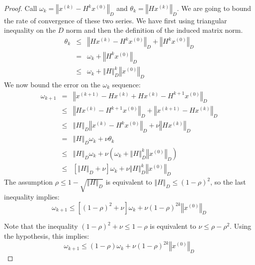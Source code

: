\begin{proof} Call $\omega_{k}=\left\Vert x^{\left(k\right)}-H^{k}x^{\left(0\right)}\right\Vert _{D}$
and $\theta_{k}=\left\Vert Hx^{\left(k\right)}\right\Vert _{D}$.
We are going to bound the rate of convergence of these two series.
We have first using triangular inequality on the $D$ norm and then
the definition of the induced matrix norm. 
\begin{eqnarray*}
\theta_{k} & \leq & \left\Vert Hx^{\left(k\right)}-H^{k}x^{\left(0\right)}\right\Vert _{D}+\left\Vert H^{k}x^{\left(0\right)}\right\Vert _{D}\\
 & = & \omega_{k}+\left\Vert H^{k}x^{\left(0\right)}\right\Vert _{D}\\
 & \leq & \omega_{k}+\left\Vert H\right\Vert _{D}^{k}\left\Vert x^{\left(0\right)}\right\Vert _{D}
\end{eqnarray*}
We now bound the error on the $\omega_{k}$ sequence: 
\begin{eqnarray*}
\omega_{k+1} & = & \left\Vert x^{\left(k+1\right)}-Hx^{\left(k\right)}+Hx^{\left(k\right)}-H^{k+1}x^{\left(0\right)}\right\Vert _{D}\\
 & \leq & \left\Vert Hx^{\left(k\right)}-H^{k+1}x^{\left(0\right)}\right\Vert _{D}+\left\Vert x^{\left(k+1\right)}-Hx^{\left(k\right)}\right\Vert _{D}\\
 & \leq & \left\Vert H\right\Vert _{D}\left\Vert x^{\left(k\right)}-H^{k}x^{\left(0\right)}\right\Vert _{D}+\nu\left\Vert Hx^{\left(k\right)}\right\Vert _{D}\\
 & = & \left\Vert H\right\Vert _{D}\omega_{k}+\nu\theta_{k}\\
 & \leq & \left\Vert H\right\Vert _{D}\omega_{k}+\nu\left(\omega_{k}+\left\Vert H\right\Vert _{D}^{k}\left\Vert x^{\left(0\right)}\right\Vert _{D}\right)\\
 & \leq & \left[\left\Vert H\right\Vert _{D}+\nu\right]\omega_{k}+\nu\left\Vert H\right\Vert _{D}^{k}\left\Vert x^{\left(0\right)}\right\Vert _{D}
\end{eqnarray*}
The assumption $\rho\leq1-\sqrt{\left\Vert H\right\Vert _{D}}$ is
equivalent to $\left\Vert H\right\Vert _{D}\leq\left(1-\rho\right)^{2}$,
so the last inequality implies:
\[
\omega_{k+1}\leq\left[\left(1-\rho\right)^{2}+\nu\right]\omega_{k}+\nu\left(1-\rho\right)^{2k}\left\Vert x^{\left(0\right)}\right\Vert _{D}
\]


Note that the inequality $\left(1-\rho\right)^{2}+\nu\leq1-\rho$
is equivalent to $\nu\leq\rho-\rho^{2}$. Using the hypothesis, this
implies: 
\begin{equation}
\omega_{k+1}\leq\left(1-\rho\right)\omega_{k}+\nu\left(1-\rho\right)^{2k}\left\Vert x^{\left(0\right)}\right\Vert _{D}\label{eq:anon1}
\end{equation}



\end{proof}
